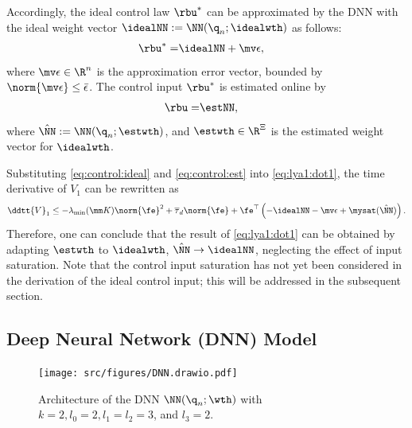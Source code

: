 \documentclass[journal]{IEEEtran}
\begin{document}
Accordingly, the ideal control law $\rbu^*$ can be approximated by the DNN with the ideal weight vector $\idealNN:=\NN({\q}_n;\idealwth)$ as follows:
\begin{align}
    \rbu^*=& \idealNN+\mv\epsilon
    ,
    \label{eq:control:ideal}
\end{align}
where $\mv\epsilon\in\R^n$ is the approximation error vector, bounded by $\norm{\mv\epsilon}\le \bar{\epsilon}$.
The control input $\rbu^*$ is estimated online by
\begin{align}
    \rbu =& \estNN,
    \label{eq:control:est}
\end{align}
where $\hat\NN:=\NN({\q}_n;\estwth)$, and  $\estwth\in\R^\Xi$ is the estimated weight vector for $\idealwth$.

Substituting \eqref{eq:control:ideal} and \eqref{eq:control:est} into \eqref{eq:lya1:dot1}, the time derivative of $V_1$ can be rewritten as
\begin{equation}
    \ddtt{V}_1
    \le 
    -\lambda_{\min}(\mm K)\norm{\fe}^2
    +
    \overline\tau_d\norm{\fe}
    +
    \fe^\top 
    \left(
        -\idealNN
        -\mv\epsilon
        +\mysat(\hat\NN)
    \right)
    .
    \label{eq:lya1:dot2}
\end{equation}
Therefore, one can conclude that the result of \eqref{eq:lya1:dot1} can be obtained by adapting $\estwth$ to $\idealwth$, \ie $\hat\NN\to\idealNN$, neglecting the effect of input saturation.
Note that the control input saturation has not yet been considered in the derivation of the ideal control input; this will be addressed in the subsequent section.

\subsection{Deep Neural Network (DNN) Model}\label{sec:sub:NN definition}

\begin{figure}[t]
    \centering
    \texttt{[image: src/figures/DNN.drawio.pdf]}
    \caption{
        Architecture of the DNN $\NN({\q}_n;\wth)$ with $k=2,l_0=2,l_1=l_2=3$, and $l_3=2$.
    }
    \label{fig:DNN}
\end{figure}
\end{document}

